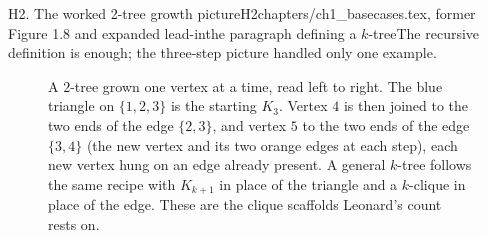 \begin{offcut}{H2. The worked 2-tree growth picture}{H2}{chapters/ch1\_basecases.tex, former Figure 1.8 and expanded lead-in}{the paragraph defining a \(k\)-tree}{The recursive definition is enough; the three-step picture handled only one example.}
\begin{figure}[ht]
{}
\caption{A $2$-tree grown one vertex at a time, read left to right. The blue triangle on $\{1,2,3\}$ is the starting $K_3$. Vertex $4$ is then joined to the two ends of the edge $\{2,3\}$, and vertex $5$ to the two ends of the edge $\{3,4\}$ (the new vertex and its two orange edges at each step), each new vertex hung on an edge already present. A general $k$-tree follows the same recipe with $K_{k+1}$ in place of the triangle and a $k$-clique in place of the edge. These are the clique scaffolds Leonard's count rests on.}
\label{fig:k-tree}
\end{figure}
\end{offcut}

